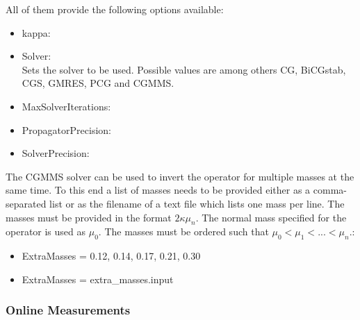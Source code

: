 All of them provide the following options available:
\begin{itemize}
\item {\ttfamily kappa}:
\item {\ttfamily Solver}:\\
  Sets the solver to be used. Possible values are among others
  {\ttfamily CG, BiCGstab, CGS, GMRES, PCG and CGMMS}.
\item {\ttfamily MaxSolverIterations}:
\item {\ttfamily PropagatorPrecision}:
\item {\ttfamily SolverPrecision}:
\end{itemize}

The {\ttfamily CGMMS} solver can be used to invert the operator for 
multiple masses at the same time. To this end a list of masses needs
to be provided either as a comma-separated list or as the filename of a
text file which lists one mass per line. The masses must be provided in the
format $2 \kappa \mu_n$. The normal mass specified for the operator is
used as $\mu_0$. The masses must be ordered such that $\mu_0 < \mu_1 < ... < \mu_n$.:

\begin{itemize}
  \item{ {\ttfamily ExtraMasses = 0.12, 0.14, 0.17, 0.21, 0.30} }
  \item{ {\ttfamily ExtraMasses = extra\_masses.input } }	
\end{itemize} 

\subsubsection{Online Measurements}
\label{sec:onlinemeasinput}

